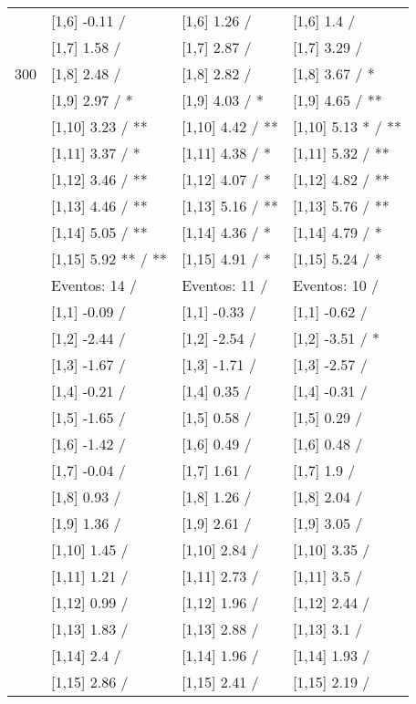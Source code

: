 \begin{table}
\begin{tabular}[t]{llll}
 & {}[1,6] -0.11  / & {}[1,6] 1.26  / & {}[1,6] 1.4  /\\
 & {}[1,7] 1.58  / & {}[1,7] 2.87  / & {}[1,7] 3.29  /\\
300 & {}[1,8] 2.48  / & {}[1,8] 2.82  / & {}[1,8] 3.67  / *\\
\addlinespace
 & {}[1,9] 2.97  / * & {}[1,9] 4.03  / * & {}[1,9] 4.65  / **\\
 & {}[1,10] 3.23  / ** & {}[1,10] 4.42  / ** & {}[1,10] 5.13 * / **\\
 & {}[1,11] 3.37  / * & {}[1,11] 4.38  / * & {}[1,11] 5.32  / **\\
 & {}[1,12] 3.46  / ** & {}[1,12] 4.07  / * & {}[1,12] 4.82  / **\\
 & {}[1,13] 4.46  / ** & {}[1,13] 5.16  / ** & {}[1,13] 5.76  / **\\
\addlinespace
 & {}[1,14] 5.05  / ** & {}[1,14] 4.36  / * & {}[1,14] 4.79  / *\\
 & {}[1,15] 5.92 ** / ** & {}[1,15] 4.91  / * & {}[1,15] 5.24  / *\\
 & Eventos:  14 / & Eventos:  11 / & Eventos:  10 /\\
 & {}[1,1] -0.09  / & {}[1,1] -0.33  / & {}[1,1] -0.62  /\\
 & {}[1,2] -2.44  / & {}[1,2] -2.54  / & {}[1,2] -3.51  / *\\
\addlinespace
 & {}[1,3] -1.67  / & {}[1,3] -1.71  / & {}[1,3] -2.57  /\\
 & {}[1,4] -0.21  / & {}[1,4] 0.35  / & {}[1,4] -0.31  /\\
 & {}[1,5] -1.65  / & {}[1,5] 0.58  / & {}[1,5] 0.29  /\\
 & {}[1,6] -1.42  / & {}[1,6] 0.49  / & {}[1,6] 0.48  /\\
 & {}[1,7] -0.04  / & {}[1,7] 1.61  / & {}[1,7] 1.9  /\\
\addlinespace
500 & {}[1,8] 0.93  / & {}[1,8] 1.26  / & {}[1,8] 2.04  /\\
 & {}[1,9] 1.36  / & {}[1,9] 2.61  / & {}[1,9] 3.05  /\\
 & {}[1,10] 1.45  / & {}[1,10] 2.84  / & {}[1,10] 3.35  /\\
 & {}[1,11] 1.21  / & {}[1,11] 2.73  / & {}[1,11] 3.5  /\\
 & {}[1,12] 0.99  / & {}[1,12] 1.96  / & {}[1,12] 2.44  /\\
\addlinespace
 & {}[1,13] 1.83  / & {}[1,13] 2.88  / & {}[1,13] 3.1  /\\
 & {}[1,14] 2.4  / & {}[1,14] 1.96  / & {}[1,14] 1.93  /\\
 & {}[1,15] 2.86  / & {}[1,15] 2.41  / & {}[1,15] 2.19  /\\
\bottomrule
\end{tabular}
\end{table}
